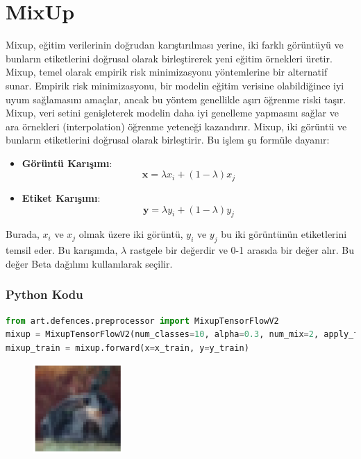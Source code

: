 \section{MixUp}

Mixup, eğitim verilerinin doğrudan karıştırılması yerine, iki farklı görüntüyü ve bunların etiketlerini doğrusal olarak birleştirerek yeni eğitim örnekleri üretir. Mixup, temel olarak empirik risk minimizasyonu yöntemlerine bir alternatif sunar. Empirik risk minimizasyonu, bir modelin eğitim verisine olabildiğince iyi uyum sağlamasını amaçlar, ancak bu yöntem genellikle aşırı öğrenme riski taşır. Mixup, veri setini genişleterek modelin daha iyi genelleme yapmasını sağlar ve ara örnekleri (interpolation) öğrenme yeteneği kazandırır. Mixup, iki görüntü ve bunların etiketlerini doğrusal olarak birleştirir. Bu işlem şu formüle dayanır:

\begin{itemize}
    \item \textbf{Görüntü Karışımı}: \[ \mathbf{x} = \lambda x_i + (1 - \lambda) x_j \]
    \item \textbf{Etiket Karışımı}: \[ \mathbf{y} = \lambda y_i + (1 - \lambda) y_j \]
\end{itemize}

Burada, $x_i$ ve $x_j$ olmak üzere iki görüntü, $y_i$ ve $y_j$ bu iki görüntünün etiketlerini temsil eder. Bu karışımda, $\lambda$ rastgele bir değerdir ve 0-1 arasıda bir değer alır. Bu değer Beta dağılımı kullanılarak seçilir.

\subsubsection{Python Kodu}

\begin{lstlisting}[language=Python]
from art.defences.preprocessor import MixupTensorFlowV2
mixup = MixupTensorFlowV2(num_classes=10, alpha=0.3, num_mix=2, apply_fit=True, apply_predict=False)
mixup_train = mixup.forward(x=x_train, y=y_train)
\end{lstlisting}

\begin{figure}[h]
    \centering
    \includegraphics[width=0.3\textwidth]{images/mixup_example.png}
    \caption{}
\end{figure}

\newpage